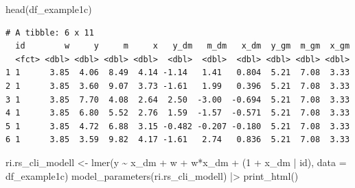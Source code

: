 \documentclass[
  letterpaper,
  DIV=11,
  numbers=noendperiod]{scrreprt}
\newenvironment{Shaded}{\begin{snugshade}}{\end{snugshade}}
\newcommand{\AttributeTok}[1]{\textcolor[rgb]{0.40,0.45,0.13}{#1}}
\newcommand{\DecValTok}[1]{\textcolor[rgb]{0.68,0.00,0.00}{#1}}
\newcommand{\FunctionTok}[1]{\textcolor[rgb]{0.28,0.35,0.67}{#1}}
\newcommand{\NormalTok}[1]{\textcolor[rgb]{0.00,0.23,0.31}{#1}}
\newcommand{\OtherTok}[1]{\textcolor[rgb]{0.00,0.23,0.31}{#1}}
\newcommand{\SpecialCharTok}[1]{\textcolor[rgb]{0.37,0.37,0.37}{#1}}
\begin{document}
\begin{Shaded}
\begin{Highlighting}[]
\FunctionTok{head}\NormalTok{(df\_example1c)}
\end{Highlighting}
\end{Shaded}

\begin{verbatim}
# A tibble: 6 x 11
  id        w     y     m     x   y_dm   m_dm   x_dm  y_gm  m_gm  x_gm
  <fct> <dbl> <dbl> <dbl> <dbl>  <dbl>  <dbl>  <dbl> <dbl> <dbl> <dbl>
1 1      3.85  4.06  8.49  4.14 -1.14   1.41   0.804  5.21  7.08  3.33
2 1      3.85  3.60  9.07  3.73 -1.61   1.99   0.396  5.21  7.08  3.33
3 1      3.85  7.70  4.08  2.64  2.50  -3.00  -0.694  5.21  7.08  3.33
4 1      3.85  6.80  5.52  2.76  1.59  -1.57  -0.571  5.21  7.08  3.33
5 1      3.85  4.72  6.88  3.15 -0.482 -0.207 -0.180  5.21  7.08  3.33
6 1      3.85  3.59  9.82  4.17 -1.61   2.74   0.836  5.21  7.08  3.33
\end{verbatim}

\begin{Shaded}
\begin{Highlighting}[]
\NormalTok{ri.rs\_cli\_modell }\OtherTok{\textless{}{-}} \FunctionTok{lmer}\NormalTok{(y }\SpecialCharTok{\textasciitilde{}}\NormalTok{ x\_dm }\SpecialCharTok{+}\NormalTok{ w }\SpecialCharTok{+}\NormalTok{ w}\SpecialCharTok{*}\NormalTok{x\_dm }\SpecialCharTok{+}\NormalTok{ (}\DecValTok{1} \SpecialCharTok{+}\NormalTok{ x\_dm }\SpecialCharTok{|}\NormalTok{ id), }\AttributeTok{data =}\NormalTok{ df\_example1c)}
\FunctionTok{model\_parameters}\NormalTok{(ri.rs\_cli\_modell) }\SpecialCharTok{|\textgreater{}} \FunctionTok{print\_html}\NormalTok{()}
\end{Highlighting}
\end{Shaded}
\end{document}
